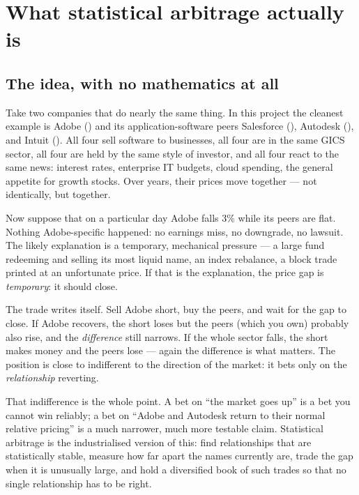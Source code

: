 \section{What statistical arbitrage actually is}
\label{ch:whatissaa}

\subsection{The idea, with no mathematics at all}
\label{sec:saa:idea}

Take two companies that do nearly the same thing. In this project the cleanest example
is Adobe () and its application-software peers Salesforce (),
Autodesk (), and Intuit (). All four sell software to businesses,
all four are in the same GICS sector, all four are held by the same style of investor,
and all four react to the same news: interest rates, enterprise IT budgets, cloud
spending, the general appetite for growth stocks. Over years, their prices move
together --- not identically, but together.

Now suppose that on a particular day Adobe falls 3\% while its peers are flat. Nothing
Adobe-specific happened: no earnings miss, no downgrade, no lawsuit. The likely
explanation is a temporary, mechanical pressure --- a large fund redeeming and selling
its most liquid name, an index rebalance, a block trade printed at an unfortunate
price. If that is the explanation, the price gap is \emph{temporary}: it should close.

The trade writes itself. Sell Adobe short, buy the peers, and wait for the gap to
close. If Adobe recovers, the short loses but the peers (which you own) probably also
rise, and the \emph{difference} still narrows. If the whole sector falls, the short
makes money and the peers lose --- again the difference is what matters. The position
is close to indifferent to the direction of the market: it bets only on the
\emph{relationship} reverting.

That indifference is the whole point. A bet on ``the market goes up'' is a bet you
cannot win reliably; a bet on ``Adobe and Autodesk return to their normal relative
pricing'' is a much narrower, much more testable claim. Statistical arbitrage is the
industrialised version of this: find relationships that are statistically stable,
measure how far apart the names currently are, trade the gap when it is unusually
large, and hold a diversified book of such trades so that no single relationship has to
be right.

